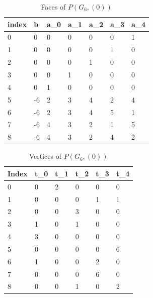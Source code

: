 \documentclass{article}
\begin{document}
\begin{table}[H]
	\centering
	\caption{Faces of $P(G_6, (0))$}
	\label{G6Faces}
	\begin{tabular}{@{}lllllll@{}}
		\toprule
		index & b  & a\_0 & a\_1 & a\_2 & a\_3 & a\_4 \\ \midrule
		0     & 0  & 0    & 0    & 0    & 0    & 1    \\
		1     & 0  & 0    & 0    & 0    & 1    & 0    \\
		2     & 0  & 0    & 0    & 1    & 0    & 0    \\
		3     & 0  & 0    & 1    & 0    & 0    & 0    \\
		4     & 0  & 1    & 0    & 0    & 0    & 0    \\
		5     & -6 & 2    & 3    & 4    & 2    & 4    \\
		6     & -6 & 2    & 3    & 4    & 5    & 1    \\
		7     & -6 & 4    & 3    & 2    & 1    & 5    \\
		8     & -6 & 4    & 3    & 2    & 4    & 2    \\ \bottomrule
	\end{tabular}
\end{table}

\begin{table}[H]
	\centering
	\caption{Vertices of $P(G_6, (0))$}
	\label{G6Verts}
	\begin{tabular}{@{}llllll@{}}
		\toprule
		Index & t\_0 & t\_1 & t\_2 & t\_3 & t\_4 \\ \midrule
		0     & 0    & 2    & 0    & 0    & 0    \\
		1     & 0    & 0    & 0    & 1    & 1    \\
		2     & 0    & 0    & 3    & 0    & 0    \\
		3     & 1    & 0    & 1    & 0    & 0    \\
		4     & 3    & 0    & 0    & 0    & 0    \\
		5     & 0    & 0    & 0    & 0    & 6    \\
		6     & 1    & 0    & 0    & 2    & 0    \\
		7     & 0    & 0    & 0    & 6    & 0    \\
		8     & 0    & 0    & 1    & 0    & 2    \\ \bottomrule
	\end{tabular}
\end{table}
\end{document}
